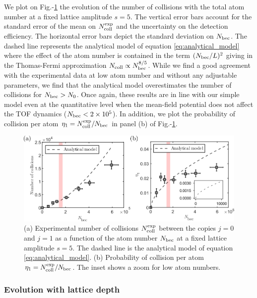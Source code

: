 We plot on Fig.-\ref{fig:ncoll_vs_atom_number} the evolution of the number of collisions with the total atom number at a fixed lattice amplitude $s=5$. The vertical error bars account for the standard error of the mean on $N_{\rm{coll}}^{\rm{exp}}$ and the uncertainty on the detection  efficiency. The horizontal error  bars depict the standard deviation on $N_{\rm{bec}}$. The dashed line represents the analytical model of equation \ref{eq:analytical_model} where the effect of the atom number is contained in the term $(N_{\rm{bec}}/L)^2$ giving in the Thomas-Fermi approximation $N_{\rm{coll}} \propto N_{\rm{bec}}^{8/5}$. While we find a good agreement with the experimental data at low atom number and without any adjustable parameters, we find that the analytical model overestimates the number of collisions for $N_{\rm{bec}} > N_0$. Once again, these results are in line with our simple model even at the quantitative level when the mean-field potential does not affect the TOF dynamics ($N_{\rm{bec}} < 2 \times 10^5$). In addition, we plot the probability of collision per atom $\eta_1=N_{\rm{coll}}^{\rm{exp}}/N_{\rm{bec}}$ in panel (b) of Fig.-\ref{fig:ncoll_vs_atom_number}.

\begin{figure}
    \centering
    \includegraphics[width=\textwidth]{Fig/Chapter3/ncoll_vs_atom_number.png}
    \caption[Experimental number of collisions and probability of collision per atom as a function of the atom number]{(a) Experimental number of collisions $N_{\rm{coll}}^{\rm{exp}}$ between the copies $j=0$ and $j=1$ as a function of the atom number $N_{\rm{bec}}$ at a fixed lattice amplitude $s=5$. The dashed line is the analytical model of equation \ref{eq:analytical_model}. (b) Probability of collision per atom $\eta_1=N_{\rm{coll}}^{\rm{exp}}/N_{\rm{bec}}$. The inset shows a zoom for low atom numbers.}
    \label{fig:ncoll_vs_atom_number}
\end{figure}

\subsubsection{Evolution with lattice depth}

